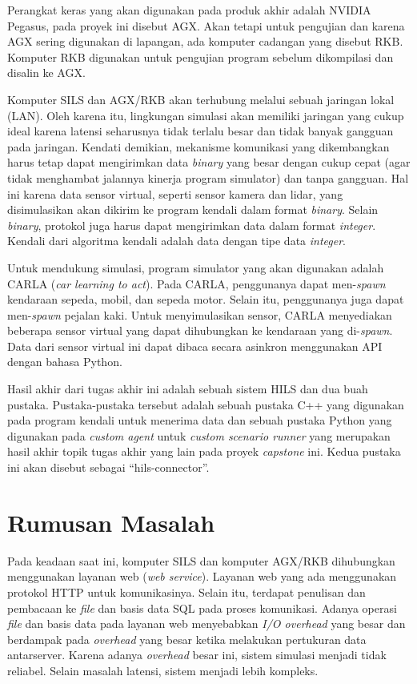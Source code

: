 Perangkat keras yang akan digunakan pada produk akhir adalah NVIDIA Pegasus,
pada proyek ini disebut AGX. Akan tetapi untuk pengujian dan karena AGX sering
digunakan di lapangan, ada komputer cadangan yang disebut RKB. Komputer RKB
digunakan untuk pengujian program sebelum dikompilasi dan disalin ke AGX.

Komputer SILS dan AGX/RKB akan terhubung melalui sebuah jaringan lokal (LAN).
Oleh karena itu, lingkungan simulasi akan memiliki jaringan yang cukup ideal
karena latensi seharusnya tidak terlalu besar dan tidak banyak gangguan pada
jaringan. Kendati demikian, mekanisme komunikasi yang dikembangkan harus tetap
dapat mengirimkan data \textit{binary} yang besar dengan cukup cepat (agar tidak
menghambat jalannya kinerja program simulator) dan tanpa gangguan. Hal ini
karena data sensor virtual, seperti sensor kamera dan lidar, yang disimulasikan
akan dikirim ke program kendali dalam format \textit{binary}. Selain
\textit{binary}, protokol juga harus dapat mengirimkan data dalam format
\textit{integer}. Kendali dari algoritma kendali adalah data dengan tipe data
\textit{integer}.

Untuk mendukung simulasi, program simulator yang akan digunakan adalah CARLA
(\textit{car learning to act}). Pada CARLA, penggunanya dapat men-\textit{spawn}
kendaraan sepeda, mobil, dan sepeda motor. Selain itu, penggunanya juga dapat
men-\textit{spawn} pejalan kaki. Untuk menyimulasikan sensor, CARLA menyediakan
beberapa sensor virtual yang dapat dihubungkan ke kendaraan yang
di-\textit{spawn}. Data dari sensor virtual ini dapat dibaca secara asinkron
menggunakan API dengan bahasa Python.

Hasil akhir dari tugas akhir ini adalah sebuah sistem HILS dan dua buah pustaka.
Pustaka-pustaka tersebut adalah sebuah pustaka C++ yang digunakan pada program
kendali untuk menerima data dan sebuah pustaka Python yang digunakan pada
\textit{custom agent} untuk \textit{custom scenario runner} yang merupakan hasil
akhir topik tugas akhir yang lain pada proyek \textit{capstone} ini. Kedua
pustaka ini akan disebut sebagai ``hils-connector''.

\section{Rumusan Masalah}

Pada keadaan saat ini, komputer SILS dan komputer AGX/RKB dihubungkan
menggunakan layanan web (\textit{web service}). Layanan web yang ada menggunakan
protokol HTTP untuk komunikasinya. Selain itu, terdapat penulisan dan pembacaan
ke \textit{file} dan basis data SQL pada proses komunikasi. Adanya operasi
\textit{file} dan basis data pada layanan web menyebabkan \textit{I/O overhead}
yang besar dan berdampak pada \textit{overhead} yang besar ketika melakukan
pertukuran data antarserver. Karena adanya \textit{overhead} besar ini, sistem
simulasi menjadi tidak reliabel. Selain masalah latensi, sistem menjadi lebih
kompleks.


